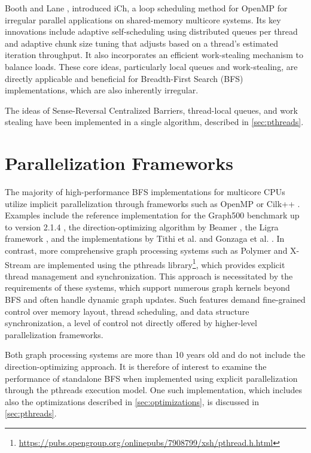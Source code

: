 Booth and Lane \cite{dennis2022adaptive}, introduced iCh, a loop scheduling method for OpenMP for irregular parallel applications on shared-memory multicore systems. Its key innovations include adaptive self-scheduling using distributed queues per thread and adaptive chunk size tuning that adjusts based on a thread's estimated iteration throughput. It also incorporates an efficient work-stealing mechanism to balance loads. These core ideas, particularly local queues and work-stealing, are directly applicable and beneficial for Breadth-First Search (BFS) implementations, which are also inherently irregular.

The ideas of Sense-Reversal Centralized
Barriers, thread-local queues, and work stealing have been implemented in a single algorithm, described in \cref{sec:pthreads}.

\section{Parallelization Frameworks}

The majority of high-performance BFS implementations for multicore CPUs utilize implicit parallelization through frameworks such as OpenMP \cite{dagum1998openmp} or Cilk++ \cite{leiserson2009cilk++}. Examples include the reference implementation for the Graph500 benchmark up to version 2.1.4 \cite{murphy2010introducing}, the direction-optimizing algorithm by Beamer \cite{beamer2013direction}, the Ligra framework \cite{shun2013ligra}, and the implementations by Tithi et al. \cite{tithi2013avoiding} and Gonzaga et al. \cite{gonzaga2024openmp}. In contrast, more comprehensive graph processing systems such as Polymer \cite{zhang2015numa} and X-Stream \cite{roy2013x} are implemented using the pthreads library\footnote{\url{https://pubs.opengroup.org/onlinepubs/7908799/xsh/pthread.h.html}}, which provides explicit thread management and synchronization. This approach is necessitated by the requirements of these systems, which support numerous graph kernels beyond BFS and often handle dynamic graph updates. Such features demand fine-grained control over memory layout, thread scheduling, and data structure synchronization, a level of control not directly offered by higher-level parallelization frameworks.

Both graph processing systems are more than 10 years old and do not include the direction-optimizing approach. It is therefore of interest to examine the performance of standalone BFS when implemented using explicit parallelization through the pthreads execution model. One such implementation, which includes also the optimizations described in \cref{sec:optimizations}, is discussed in \cref{sec:pthreads}.